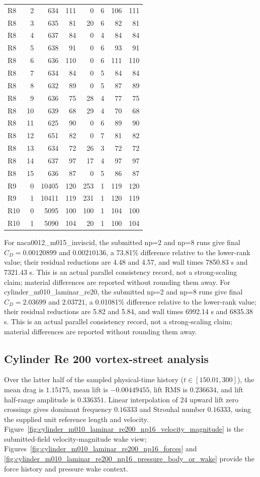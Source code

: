 \begin{longtable}{lrrrrrrr}
R8 & 2 & 634 & 111 & 0 & 6 & 106 & 111\\
R8 & 3 & 635 & 81 & 20 & 6 & 82 & 81\\
R8 & 4 & 637 & 84 & 0 & 4 & 84 & 84\\
R8 & 5 & 638 & 91 & 0 & 6 & 93 & 91\\
R8 & 6 & 636 & 110 & 0 & 6 & 111 & 110\\
R8 & 7 & 634 & 84 & 0 & 5 & 84 & 84\\
R8 & 8 & 632 & 89 & 0 & 5 & 87 & 89\\
R8 & 9 & 636 & 75 & 28 & 4 & 77 & 75\\
R8 & 10 & 639 & 68 & 29 & 4 & 70 & 68\\
R8 & 11 & 625 & 90 & 0 & 6 & 89 & 90\\
R8 & 12 & 651 & 82 & 0 & 7 & 81 & 82\\
R8 & 13 & 634 & 72 & 26 & 3 & 72 & 72\\
R8 & 14 & 637 & 97 & 17 & 4 & 97 & 97\\
R8 & 15 & 636 & 87 & 0 & 5 & 86 & 87\\
R9 & 0 & 10405 & 120 & 253 & 1 & 119 & 120\\
R9 & 1 & 10411 & 119 & 231 & 1 & 120 & 119\\
R10 & 0 & 5095 & 100 & 100 & 1 & 104 & 100\\
R10 & 1 & 5090 & 104 & 20 & 1 & 100 & 104\\
\bottomrule
\end{longtable}
\endgroup
For naca0012\_m015\_inviscid, the submitted np=2 and np=8 runs give final $C_D=0.00120899$ and $0.00210136$, a 73.81\% difference relative to the lower-rank value; their residual reductions are 4.48 and 4.57, and wall times 7850.83 s and 7321.43 s. This is an actual parallel consistency record, not a strong-scaling claim; material differences are reported without rounding them away.
For cylinder\_m010\_laminar\_re20, the submitted np=2 and np=8 runs give final $C_D=2.03699$ and $2.03721$, a 0.01081\% difference relative to the lower-rank value; their residual reductions are 5.82 and 5.84, and wall times 6992.14 s and 6835.38 s. This is an actual parallel consistency record, not a strong-scaling claim; material differences are reported without rounding them away.
\subsection{Cylinder Re 200 vortex-street analysis}
Over the latter half of the sampled physical-time history ($t \in [150.01, 300]$), the mean drag is $1.15175$, mean lift is $-0.00449455$, lift RMS is $0.236634$, and lift half-range amplitude is $0.336351$. Linear interpolation of 24 upward lift zero crossings gives dominant frequency $0.16333$ and Strouhal number $0.16333$, using the supplied unit reference length and velocity. Figure~\ref{fig:cylinder_m010_laminar_re200_np16_velocity_magnitude} is the submitted-field velocity-magnitude wake view; Figures~\ref{fig:cylinder_m010_laminar_re200_np16_forces} and \ref{fig:cylinder_m010_laminar_re200_np16_pressure_body_or_wake} provide the force history and pressure wake context.
